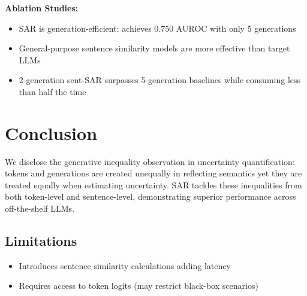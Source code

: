\textbf{Ablation Studies:}
\begin{itemize}
\item SAR is generation-efficient: achieves 0.750 AUROC with only 5 generations
\item General-purpose sentence similarity models are more effective than target LLMs
\item 2-generation sent-SAR surpasses 5-generation baselines while consuming less than half the time
\end{itemize}

\section{Conclusion}
We disclose the generative inequality observation in uncertainty quantification: tokens and generations are created unequally in reflecting semantics yet they are treated equally when estimating uncertainty. SAR tackles these inequalities from both token-level and sentence-level, demonstrating superior performance across off-the-shelf LLMs.

\subsection{Limitations}
\begin{itemize}
\item Introduces sentence similarity calculations adding latency
\item Requires access to token logits (may restrict black-box scenarios)
\end{itemize}
